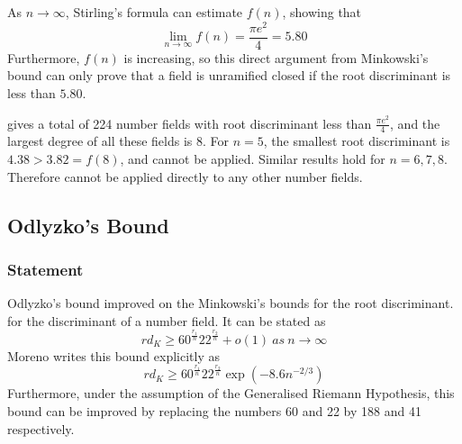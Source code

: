 \documentclass[12pt]{extarticle}
\newcommand{\<}{\langle}
\renewcommand{\>}{\rangle}
\theoremstyle{definition}
\begin{document}
As $n\rightarrow \infty$, Stirling's formula can estimate $f(n)$, showing that
\begin{equation}
    \lim_{n\to\infty} f(n) = \frac{\pi e^2}{4} = 5.80
\end{equation}
Furthermore, $f(n)$ is increasing, so this direct argument from Minkowski's bound can only prove that a field is unramified closed if the root discriminant is less than $5.80$. 

\cite{JONE2} gives a total of 224 number fields with root discriminant less than $ \frac{\pi e^2}{4}$, and the largest degree of all these fields is $8$. For $n=5$, the smallest root discriminant is $4.38 > 3.82 = f(8)$, and  cannot be applied. Similar results hold for $n = 6,7,8$. Therefore  cannot be applied directly to any other number fields. 
\subsection{Odlyzko's Bound}
\subsubsection*{Statement}
Odlyzko's bound \cite{ODL1990} improved on the Minkowski's bounds for the root discriminant. for the discriminant of a number field. It can be stated as  
\begin{equation}
\label{eqn:odlyzko}
rd_K\geqslant 60^{\frac{r_1}{n}}22^{\frac{r_2}{n}}+o(1)\:as\:n\rightarrow \infty   
\end{equation}
Moreno \cite{MORENO} writes this bound explicitly as 
\begin{equation}
rd_K\geqslant 60^{\frac{r_1}{n}}22^{\frac{r_2}{n}}\exp\left(-8.6n^{-2/3}\right) \label{Moreno}
\end{equation}
Furthermore, under the assumption of the Generalised Riemann Hypothesis, 
this bound can be improved by replacing the numbers 60 and 22 by 188 and 41 respectively. 
\end{document}
